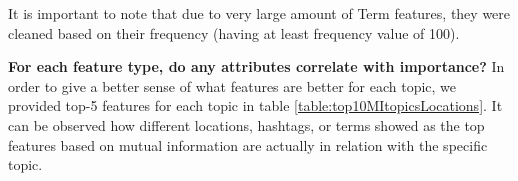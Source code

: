 It is important to note that due to very large amount of Term features, they were cleaned based on their frequency (having at least frequency value of 100).

\textbf{For each feature type, do any attributes correlate with importance?} In order to give a better sense of what features are better for each topic, we provided top-5 features for each topic in table \ref{table:top10MItopicsLocations}. It can be observed how different locations, hashtags, or terms showed as the top features based on mutual information are actually in relation with the specific topic.%

